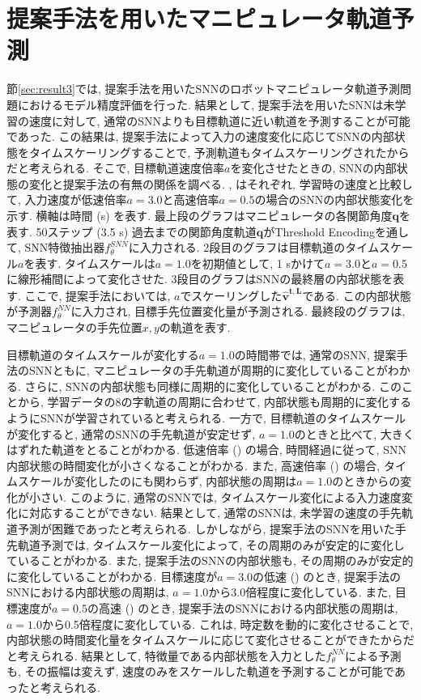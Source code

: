 \section{提案手法を用いたマニピュレータ軌道予測}

節\ref{sec:result3}では, 提案手法を用いたSNNのロボットマニピュレータ軌道予測問題におけるモデル精度評価を行った.
結果として, 提案手法を用いたSNNは未学習の速度に対して, 通常のSNNよりも目標軌道に近い軌道を予測することが可能であった.
この結果は, 提案手法によって入力の速度変化に応じてSNNの内部状態をタイムスケーリングすることで, 予測軌道もタイムスケーリングされたからだと考えられる.
そこで, 目標軌道速度倍率$a$を変化させたときの, SNNの内部状態の変化と提案手法の有無の関係を調べる.
, はそれぞれ, 学習時の速度と比較して, 入力速度が低速倍率$a=3.0$と高速倍率$a=0.5$の場合のSNNの内部状態変化を示す.
横軸は時間 (s) を表す.
最上段のグラフはマニピュレータの各関節角度$\bm{q}$を表す.
50ステップ (3.5 s) 過去までの関節角度軌道$\bm{q}$がThreshold Encodingを通して, SNN特徴抽出器$f^{SNN}_\theta$に入力される.
2段目のグラフは目標軌道のタイムスケール$a$を表す.
タイムスケールは$a=1.0$を初期値として, 1 sかけて$a=3.0$と$a=0.5$に線形補間によって変化させた.
3段目のグラフはSNNの最終層の内部状態を表す.
ここで, 提案手法においては, $a$でスケーリングした$\bm{\hat{v}^{t,L}}$である.
この内部状態が予測器$f^{NN}_\theta$に入力され, 目標手先位置変化量が予測される.
最終段のグラフは, マニピュレータの手先位置$x,y$の軌道を表す.

目標軌道のタイムスケールが変化する$a=1.0$の時間帯では, 通常のSNN, 提案手法のSNNともに, マニピュレータの手先軌道が周期的に変化していることがわかる.
さらに, SNNの内部状態も同様に周期的に変化していることがわかる.
このことから, 学習データの8の字軌道の周期に合わせて, 内部状態も周期的に変化するようにSNNが学習されていると考えられる.
一方で, 目標軌道のタイムスケールが変化すると, 通常のSNNの手先軌道が安定せず, $a=1.0$のときと比べて, 大きくはずれた軌道をとることがわかる.
低速倍率 () の場合, 時間経過に従って, SNN内部状態の時間変化が小さくなることがわかる.
また, 高速倍率 () の場合, タイムスケールが変化したのにも関わらず, 内部状態の周期は$a=1.0$のときからの変化が小さい.
このように, 通常のSNNでは, タイムスケール変化による入力速度変化に対応することができない.
結果として, 通常のSNNは, 未学習の速度の手先軌道予測が困難であったと考えられる.
しかしながら, 提案手法のSNNを用いた手先軌道予測では, タイムスケール変化によって, その周期のみが安定的に変化していることがわかる.
また, 提案手法のSNNの内部状態も, その周期のみが安定的に変化していることがわかる.
目標速度が$a=3.0$の低速 () のとき, 提案手法のSNNにおける内部状態の周期は, $a=1.0$から3.0倍程度に変化している.
また, 目標速度が$a=0.5$の高速 () のとき, 提案手法のSNNにおける内部状態の周期は, $a=1.0$から0.5倍程度に変化している.
これは, 時定数を動的に変化させることで, 内部状態の時間変化量をタイムスケールに応じて変化させることができたからだと考えられる.
結果として, 特徴量である内部状態を入力とした$f^{NN}_\theta$による予測も, その振幅は変えず, 速度のみをスケールした軌道を予測することが可能であったと考えられる.

